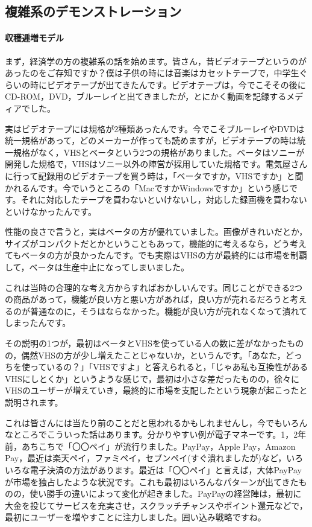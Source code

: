 \documentclass{ltjsbook}
\begin{document}
\subsection{複雑系のデモンストレーション}
\paragraph{収穫逓増モデル}

まず，経済学の方の複雑系の話を始めます。皆さん，昔ビデオテープというのがあったのをご存知ですか？僕は子供の時には音楽はカセットテープで，中学生ぐらいの時にビデオテープが出てきたんです。ビデオテープは，今でこそその後にCD-ROM，DVD，ブルーレイと出てきましたが，とにかく動画を記録するメディアでした。

実はビデオテープには規格が2種類あったんです。今でこそブルーレイやDVDは統一規格があって，どのメーカーが作っても読めますが，ビデオテープの時は統一規格がなく，VHSとベータという2つの規格がありました。ベータはソニーが開発した規格で，VHSはソニー以外の陣営が採用していた規格です。電気屋さんに行って記録用のビデオテープを買う時は，「ベータですか，VHSですか」と聞かれるんです。今でいうところの「MacですかWindowsですか」という感じです。それに対応したテープを買わないといけないし，対応した録画機を買わないといけなかったんです。

性能の良さで言うと，実はベータの方が優れていました。画像がきれいだとか，サイズがコンパクトだとかということもあって，機能的に考えるなら，どう考えてもベータの方が良かったんです。でも実際はVHSの方が最終的には市場を制覇して，ベータは生産中止になってしまいました。

これは当時の合理的な考え方からすればおかしいんです。同じことができる2つの商品があって，機能が良い方と悪い方があれば，良い方が売れるだろうと考えるのが普通なのに，そうはならなかった。機能が良い方が売れなくなって潰れてしまったんです。

その説明の1つが，最初はベータとVHSを使っている人の数に差がなかったものの，偶然VHSの方が少し増えたことじゃないか，というんです。「あなた，どっちを使っているの？」「VHSですよ」と答えられると，「じゃあ私も互換性があるVHSにしとくか」というような感じで，最初は小さな差だったものの，徐々にVHSのユーザーが増えていき，最終的に市場を支配したという現象が起こったと説明されます。

これは皆さんには当たり前のことだと思われるかもしれませんし，今でもいろんなところでこういった話はあります。分かりやすい例が電子マネーです。1，2年前，あちこちで「〇〇ペイ」が流行りました。PayPay，Apple Pay，Amazon Pay，最近は楽天ペイ，ファミペイ，セブンペイ(すぐ潰れましたが)など，いろいろな電子決済の方法があります。最近は「〇〇ペイ」と言えば，大体PayPayが市場を独占したような状況です。これも最初はいろんなパターンが出てきたものの，使い勝手の違いによって変化が起きました。PayPayの経営陣は，最初に大金を投じてサービスを充実させ，スクラッチチャンスやポイント還元などで，最初にユーザーを増やすことに注力しました。囲い込み戦略ですね。
\end{document}
